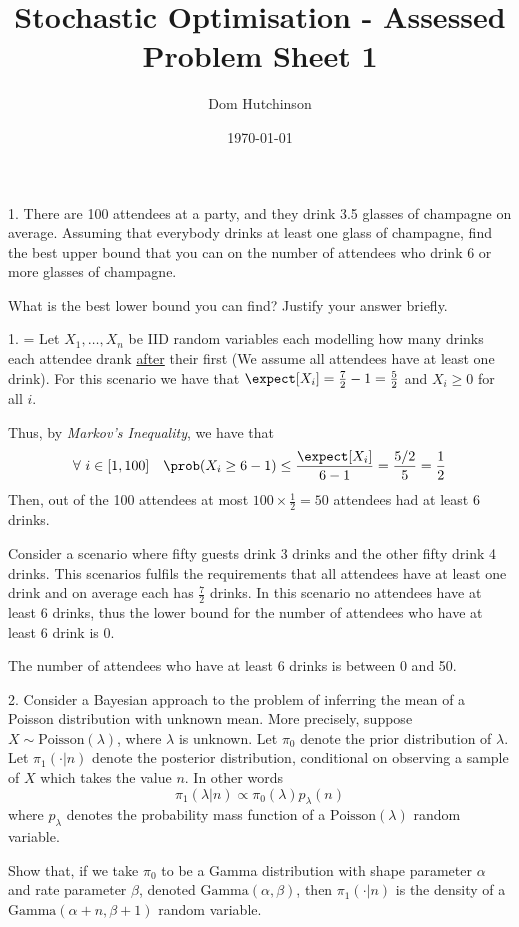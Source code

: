 \documentclass[11pt,a4paper]{article}
\begin{document}

\title{Stochastic Optimisation - Assessed Problem Sheet 1}
\author{Dom Hutchinson}
\date{\today}
\maketitle


\begin{question}{1.}
  There are 100 attendees at a party, and they drink 3.5 glasses of champagne on average. Assuming that everybody drinks at least one glass of champagne, find the best upper bound that you can on the number of attendees who drink 6 or more glasses of champagne.
  \par What is the best lower bound you can find? Justify your answer briefly.
\end{question}

\begin{answer}{1.}
  \everymath={}
  Let $X_1,\dots,X_n$ be IID random variables each modelling how many drinks each attendee drank \underline{after} their first (We assume all attendees have at least one drink). For this scenario we have that $\expect[X_i]=\frac72-1=\frac52$ and $X_i\geq0$ for all $i$.
  \par Thus, by \textit{Markov's Inequality}, we have that
  \[ \forall\ i\in[1,100]\quad\prob(X_i\geq6-1)\leq\frac{\expect[X_i]}{6-1}=\frac{5/2}5=\frac12 \]
  Then, out of the 100 attendees at most $100\times\frac12=50$ attendees had at least 6 drinks.
  \par Consider a scenario where fifty guests drink 3 drinks and the other fifty drink 4 drinks. This scenarios fulfils the requirements that all attendees have at least one drink and on average each has $\frac72$ drinks. In this scenario no attendees have at least 6 drinks, thus the lower bound for the number of attendees who have at least 6 drink is 0.
  \par The number of attendees who have at least 6 drinks is between 0 and 50.
\end{answer}

\begin{question}{2.}
  Consider a Bayesian approach to the problem of inferring the mean of a Poisson distribution with unknown mean. More precisely, suppose $X\sim\text{Poisson}(\lambda)$, where $\lambda$ is unknown. Let $\pi_0$ denote the prior distribution of $\lambda$. Let $\pi_1(\cdot|n)$ denote the posterior distribution, conditional on observing a sample of $X$ which takes the value $n$. In other words
  \[ \pi_1(\lambda|n)\propto \pi_0(\lambda)p_\lambda(n) \]
  where $p_\lambda$ denotes the probability mass function of a $\text{Poisson}(\lambda)$ random variable.
  \par Show that, if we take $\pi_0$ to be a Gamma distribution with shape parameter $\alpha$ and rate parameter $\beta$, denoted $\text{Gamma}(\alpha,\beta)$, then $\pi_1(\cdot|n)$ is the density of a $\text{Gamma}(\alpha+n,\beta+1)$ random variable.
\end{question}
\end{document}
